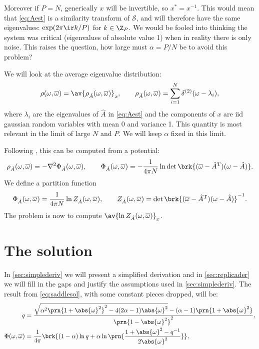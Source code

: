 \documentclass[12pt]{article}
\newcommand{\inv}{^{-1}}
\newcommand{\trans}{^\mathrm{T}}
\newcommand{\shift}{\mathcal{S}}
\newcommand{\aest}{\hat{A}}
\newcommand{\omb}{\overline{\omega}}
\newcommand{\oas}{\abs{\omega}^2}
\newcommand{\opo}{\prn{1+\abs{\omega}^2}}
\newcommand{\omo}{\prn{1-\abs{\omega}^2}}
\begin{document}
Moreover if $P=N$, generically $x$ will be invertible, so $x^*=x\inv$.
This would mean that \eqref{eq:Aest} is a similarity transform of $\shift$, and will therefore have the same eigenvalues: $\exp(2\pi\ir k/P)$ for $k\in\Z_P$.
We would be fooled into thinking the system was critical (eigenvalues of absolute value 1) when in reality there is only noise.
This raises the question, how large must $\alpha=P/N$ be to avoid this problem?

We will look at the average eigenvalue distribution:
%
\begin{equation}\label{eq:eigdist}
  \rho(\omega,\omb) = \av{\rho_{\aest} (\omega,\omb)}_x,
  \qquad
  \rho_{\aest}(\omega,\omb) = \sum_{i=1}^N \delta^{(2)}(\omega-\lambda_i),
\end{equation}
%
where $\lambda_i$ are the eigenvalues of $\aest$ in \eqref{eq:Aest} and
the components of $x$ are iid gaussian random variables with mean 0 and variance 1.
This quantity is most relevant in the limit of large $N$ and $P$.
We will keep $\alpha$ fixed in this limit.

Following \cite{Sommers1988asymmetric}, this can be computed from a potential:
%
\begin{equation}\label{eq:potential}
  \rho_{\aest}(\omega,\omb) = -\nabla^2 \Phi_{\aest} (\omega,\omb),
  \qquad
  \Phi_{\aest} (\omega,\omb) = -\frac{1}{4\pi N} \ln\det \brk{(\omb-\aest \trans)(\omega-\aest )}.
\end{equation}
%
We define a partition function
%
\begin{equation}\label{eq:partfn}
  \Phi_{\aest} (\omega,\omb) = \frac{1}{4\pi N} \ln Z_{\aest} (\omega,\omb),
  \qquad
  Z_{\aest} (\omega,\omb) = \det \brk{(\omb-\aest \trans)(\omega-\aest )}\inv.
\end{equation}
%
The problem is now to compute $\av{\ln Z_{\aest} (\omega,\omb)}_x$.


\section{The solution}\label{sec:solution}

In \autoref{sec:simplederiv} we will present a simplified derivation and in \autoref{sec:replicader} we will fill in the gaps and justify the assumptions used in \autoref{sec:simplederiv}.
The result from \eqref{eq:saddlesol}, with some constant pieces dropped, will be:
%
\begin{equation}\label{eq:phisol}
\begin{aligned}
  q &= \frac{ \sqrt{\alpha^2\opo^2 - 4(2\alpha-1)\oas} - (\alpha-1)\opo }{\omo^2},\\
  \Phi(\omega,\omb) &= \frac{1}{4\pi}\brk{ (1-\alpha)\ln q +\alpha\ln\prn{\frac{1+\abs{\omega}^2-q\inv}{2\oas}} },
\end{aligned}
\end{equation}
\end{document}
